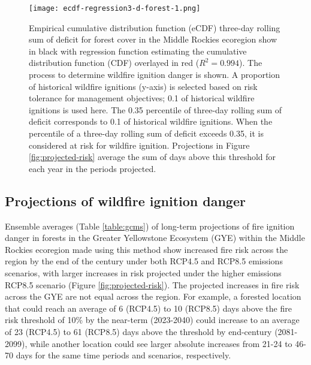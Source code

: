\documentclass[11p]{article}
\begin{document}
\begin{figure}[!htbp]
  \centering
  \texttt{[image: ecdf-regression3-d-forest-1.png]}
  \caption{Empirical cumulative distribution function (eCDF) three-day rolling sum of deficit for forest cover in the Middle Rockies ecoregion show in black with regression function estimating the cumulative distribution function (CDF) overlayed in red ($R^2 = 0.994$). The process to determine wildfire ignition danger is shown. A proportion of historical wildfire ignitions (y-axis) is selected based on risk tolerance for management objectives; 0.1 of historical wildfire ignitions is used here. The 0.35 percentile of three-day rolling sum of deficit corresponds to 0.1 of historical wildfire ignitions. When the percentile of a three-day rolling sum of deficit exceeds 0.35, it is considered at risk for wildfire ignition. Projections in Figure \ref{fig:projected-risk} average the sum of days above this threshold for each year in the periods projected.}
  \label{fig:ecdf}
\end{figure}

\subsection{Projections of wildfire ignition danger}

Ensemble averages (Table \ref{table:gcms}) of long-term projections of fire ignition danger in forests in the Greater Yellowstone Ecosystem (GYE) within the Middle Rockies ecoregion made using this method show increased fire risk across the region by the end of the century under both RCP4.5 and RCP8.5 emissions scenarios, with larger increases in risk projected under the higher emissions RCP8.5 scenario (Figure \ref{fig:projected-risk}). The projected increases in fire risk across the GYE are not equal across the region. For example, a forested location that could reach an average of 6 (RCP4.5) to 10 (RCP8.5) days above the fire risk threshold of 10\% by the near-term (2023-2040) could increase to an average of 23 (RCP4.5) to 61 (RCP8.5) days above the threshold by end-century (2081-2099), while another location could see larger absolute increases from 21-24 to 46-70 days for the same time periods and scenarios, respectively.
\end{document}
